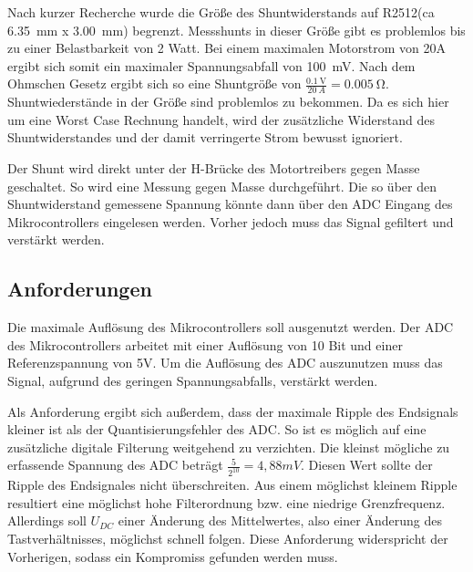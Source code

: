 Nach kurzer Recherche wurde die Größe des Shuntwiderstands auf R2512(ca \SI{6,35}{\mm} x \SI{3,00}{\mm}) begrenzt. Messshunts in dieser Größe gibt es problemlos bis zu einer Belastbarkeit von 2 Watt. 
Bei einem maximalen Motorstrom von 20A ergibt sich somit ein maximaler Spannungsabfall von \SI{100}{\mV}. Nach dem Ohmschen Gesetz ergibt sich so eine Shuntgröße von
$\frac{\SI{0,1}{\V}}{\SI{20}{A}}=\SI{0,005}{\ohm}$. Shuntwiederstände in der Größe sind problemlos zu bekommen.
Da es sich hier um eine Worst Case Rechnung handelt, wird der zusätzliche Widerstand des Shuntwiderstandes und der damit verringerte Strom bewusst ignoriert.

Der Shunt wird direkt unter der H-Brücke des Motortreibers gegen Masse geschaltet. So wird eine Messung gegen Masse durchgeführt. Die so über den Shuntwiderstand gemessene Spannung könnte 
dann über den ADC Eingang des Mikrocontrollers eingelesen werden. Vorher jedoch muss das Signal gefiltert und verstärkt werden.

\subsection{Anforderungen}
Die maximale Auflösung des Mikrocontrollers soll ausgenutzt werden. Der ADC des Mikrocontrollers arbeitet mit einer Auflösung von 10 Bit und einer 
Referenzspannung von 5V. Um die Auflösung des ADC auszunutzen muss das Signal, aufgrund des geringen Spannungsabfalls, verstärkt werden.

Als Anforderung ergibt sich außerdem, dass der maximale Ripple des Endsignals kleiner ist als der Quantisierungsfehler des ADC.
So ist es möglich auf eine zusätzliche digitale Filterung weitgehend zu verzichten.
Die kleinst mögliche zu erfassende Spannung des ADC beträgt $\frac{5}{2^{10}}=4,88mV$.
Diesen Wert sollte der Ripple des Endsignales nicht überschreiten.
Aus einem möglichst kleinem Ripple resultiert eine möglichst hohe Filterordnung bzw. eine niedrige Grenzfrequenz.
Allerdings soll $U_{DC}$ einer Änderung des Mittelwertes, also einer Änderung des Tastverhältnisses, möglichst
schnell folgen. Diese Anforderung widerspricht der Vorherigen, sodass ein Kompromiss gefunden werden muss.

